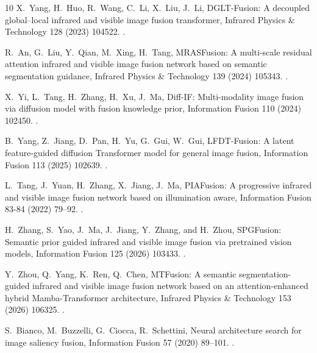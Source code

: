 \begin{thebibliography}{10}
X.~Yang, H.~Huo, R.~Wang, C.~Li, X.~Liu, J.~Li, {DGLT-Fusion: A decoupled
  global–local infrared and visible image fusion transformer}, Infrared
  Physics \& Technology 128 (2023) 104522.
\newblock \href {https://doi.org/10.1016/j.infrared.2022.104522}
  {}.

R.~An, G.~Liu, Y.~Qian, M.~Xing, H.~Tang, {MRASFusion: A multi-scale residual
  attention infrared and visible image fusion network based on semantic
  segmentation guidance}, Infrared Physics \& Technology 139 (2024) 105343.
\newblock \href {https://doi.org/10.1016/j.infrared.2024.105343}
  {}.

X.~Yi, L.~Tang, H.~Zhang, H.~Xu, J.~Ma, {Diff-IF: Multi-modality image fusion
  via diffusion model with fusion knowledge prior}, Information Fusion 110
  (2024) 102450.
\newblock \href {https://doi.org/10.1016/j.inffus.2024.102450}
  {}.

B.~Yang, Z.~Jiang, D.~Pan, H.~Yu, G.~Gui, W.~Gui, {LFDT-Fusion: A latent
  feature-guided diffusion Transformer model for general image fusion},
  Information Fusion 113 (2025) 102639.
\newblock \href {https://doi.org/10.1016/j.inffus.2024.102639}
  {}.

L.~Tang, J.~Yuan, H.~Zhang, X.~Jiang, J.~Ma, {PIAFusion: A progressive infrared
  and visible image fusion network based on illumination aware}, Information
  Fusion 83-84 (2022) 79--92.
\newblock \href {https://doi.org/10.1016/j.inffus.2022.03.007}
  {}.

H.~Zhang, S.~Yao, J.~Ma, J.~Jiang, Y.~Zhang, and H.~Zhou, {SPGFusion: Semantic
  prior guided infrared and visible image fusion via pretrained vision models},
  Information Fusion 125 (2026) 103433.
\newblock \href {https://doi.org/10.1016/j.inffus.2025.103433}
  {}.

Y.~Zhou, Q.~Yang, K.~Ren, Q.~Chen, {MTFusion: A semantic segmentation-guided
  infrared and visible image fusion network based on an attention-enhanced
  hybrid Mamba-Transformer architecture}, Infrared Physics \& Technology 153
  (2026) 106325.
\newblock \href {https://doi.org/10.1016/j.infrared.2025.106325}
  {}.

S.~Bianco, M.~Buzzelli, G.~Ciocca, R.~Schettini, {Neural architecture search
  for image saliency fusion}, Information Fusion 57 (2020) 89--101.
\newblock \href {https://doi.org/10.1016/j.inffus.2019.12.007}
  {}.


\end{thebibliography}
